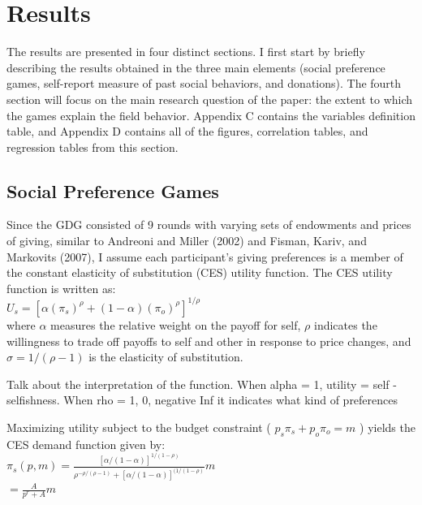 \documentclass[12pt]{article}
\begin{document}
\section{Results}
The results are presented in four distinct sections. I first start by briefly describing the results obtained in the three main elements (social preference games, self-report measure of past social behaviors, and donations). The fourth section will focus on the main research question of the paper: the extent to which the games explain the field behavior. Appendix C contains the variables definition table, and Appendix D contains all of the figures, correlation tables, and regression tables from this section.

\subsection{Social Preference Games}
Since the GDG consisted of 9 rounds with varying sets of endowments and prices of giving, similar to Andreoni and Miller (2002) and Fisman, Kariv, and Markovits (2007), I assume each participant\rq s giving preferences is a member of the constant elasticity of substitution (CES) utility function.  The CES utility function is written as: \\

\(U_{s} = [\alpha(\pi_{s})^{\rho} + (1-\alpha)(\pi_{o})^{\rho}]^{1/\rho} \) \\

\noindent
where \(\alpha\) measures the relative weight on the payoff for self, \(\rho\) indicates the willingness to trade off payoffs to self and other in response to price changes, and \(\sigma = 1/(\rho - 1) \) is the elasticity of substitution. 

{\color{red} Talk about the interpretation of the function. When alpha = 1, utility = self - selfishness. When rho = 1, 0, negative Inf it indicates what kind of preferences}


Maximizing utility subject to the budget constraint ( \(p_{s}\pi_{s} + p_{o}\pi_{o}=m\) ) yields the CES demand function given by: \\
 
\(\pi_{s}(p,m)=\frac{[\alpha/(1-\alpha)]^{1/(1-\rho)}}{\rho^{-\rho/(\rho-1)}+[\alpha/(1-\alpha)]^{(1/(1-\rho)}}m\) \\

\hspace{15mm} \(= \frac{A}{p^{r}+A}m \) \\
 
\end{document}

